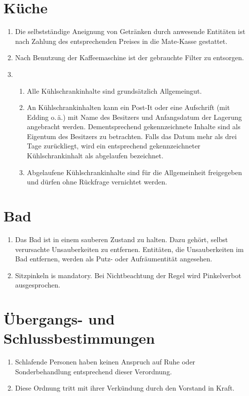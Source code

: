 \documentclass[12pt,a4paper]{scrartcl}
\begin{document}
\section{Küche}
\begin{enumerate}
  \item Die selbstständige Aneignung von Getränken durch anwesende Entitäten ist
    nach Zahlung des entsprechenden Preises in die Mate-Kasse gestattet.
  \item Nach Benutzung der Kaffeemaschine ist der gebrauchte Filter zu
    entsorgen.
  \item\begin{enumerate}
    \item Alle Kühlschrankinhalte sind grundsätzlich Allgemeingut.
    \item An Kühlschrankinhalten kann ein Post-It oder eine Aufschrift
      (mit Edding o.\,ä.) mit Name des Besitzers und Anfangsdatum der Lagerung
      angebracht werden. Dementsprechend gekennzeichnete Inhalte sind als
      Eigentum des Besitzers zu betrachten. Falls das Datum mehr als drei Tage
      zurückliegt, wird ein entsprechend gekennzeichneter Kühlschrankinhalt als
      abgelaufen bezeichnet.
    \item Abgelaufene Kühlschrankinhalte sind für die Allgemeinheit freigegeben
      und dürfen ohne Rückfrage vernichtet werden.
  \end{enumerate}
\end{enumerate}

\section{Bad}
\begin{enumerate}
  \item Das Bad ist in einem sauberen Zustand zu halten. Dazu gehört, selbst
    verursachte Unsauberkeiten zu entfernen. Entitäten, die Unsauberkeiten im
    Bad entfernen, werden als Putz- oder Aufräumentität angesehen.

  \item Sitzpinkeln is mandatory. Bei Nichtbeachtung der Regel wird
    Pinkelverbot ausgesprochen.
\end{enumerate}

\enlargethispage{1em}
\section{Übergangs- und Schlussbestimmungen}
\begin{enumerate}
  \item Schlafende Personen haben keinen Anspruch auf Ruhe oder Sonderbehandlung
    entsprechend dieser Verordnung.

  \item Diese Ordnung tritt mit ihrer Verkündung durch den Vorstand in Kraft.
\end{enumerate}
\end{document}
